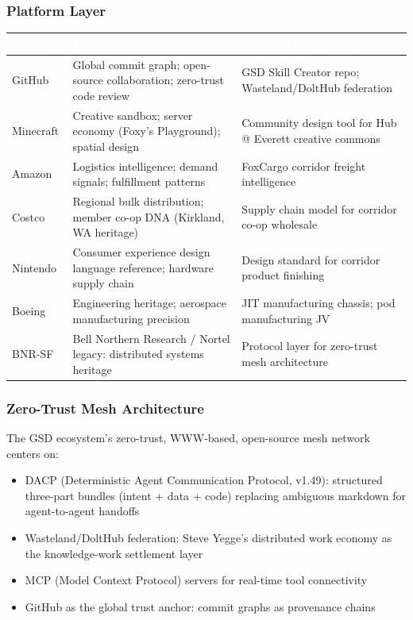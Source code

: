 \documentclass[11pt,letterpaper]{article}
\newcommand{\tableheader}[1]{\textbf{\sffamily\textcolor{white}{#1}}}
\begin{document}
\subsubsection{Platform Layer}

\begin{center}
\begin{tabularx}{\textwidth}{L{2.5cm}XX}
\toprule
{}
\tableheader{Platform} & \tableheader{Role in Mesh} & \tableheader{Corridor Integration} \\
\midrule
GitHub & Global commit graph; open-source collaboration; zero-trust code review & GSD Skill Creator repo; Wasteland/DoltHub federation \\
Minecraft & Creative sandbox; server economy (Foxy's Playground); spatial design & Community design tool for Hub @ Everett creative commons \\
Amazon & Logistics intelligence; demand signals; fulfillment patterns & FoxCargo corridor freight intelligence \\
Costco & Regional bulk distribution; member co-op DNA (Kirkland, WA heritage) & Supply chain model for corridor co-op wholesale \\
Nintendo & Consumer experience design language reference; hardware supply chain & Design standard for corridor product finishing \\
Boeing & Engineering heritage; aerospace manufacturing precision & JIT manufacturing chassis; pod manufacturing JV \\
BNR-SF & Bell Northern Research / Nortel legacy: distributed systems heritage & Protocol layer for zero-trust mesh architecture \\
\bottomrule
\end{tabularx}
\end{center}

\subsubsection{Zero-Trust Mesh Architecture}

The GSD ecosystem's zero-trust, WWW-based, open-source mesh network centers on:
\begin{itemize}[leftmargin=*]
  \item DACP (Deterministic Agent Communication Protocol, v1.49): structured three-part bundles (intent + data + code) replacing ambiguous markdown for agent-to-agent handoffs
  \item Wasteland/DoltHub federation: Steve Yegge's distributed work economy as the knowledge-work settlement layer
  \item MCP (Model Context Protocol) servers for real-time tool connectivity
  \item GitHub as the global trust anchor: commit graphs as provenance chains
\end{itemize}
\end{document}
